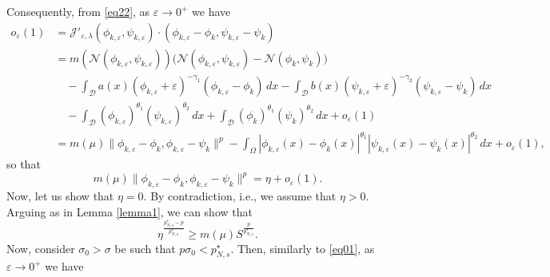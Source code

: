 \documentclass[10pt,a4paper]{amsart}
\numberwithin{equation}{section}
\begin{document}
Consequently, from \eqref{eq22}, as $\varepsilon\to 0^+$ we have
\begin{align*}
o_\varepsilon(1)
&=\mathcal{J}'_{\varepsilon,\lambda}(\phi_{k,\varepsilon},\psi_{k,\varepsilon})\cdot(\phi_{k,\varepsilon}-\phi_k,\psi_{k,\varepsilon}-\psi_k)\\
&=m(\mathcal{N}(\phi_{k,\varepsilon},\psi_{k,\varepsilon}))\Big(\mathcal{N}(\phi_{k,\varepsilon},\psi_{k,\varepsilon})-\mathcal{N}(\phi_k,\psi_k)\Big)\\
&\quad -\int_\mathcal{D}a(x) (\phi_{k,\varepsilon}+\varepsilon)^{-\gamma_1}(\phi_{k,\varepsilon}-\phi_k)\,dx-\int_\mathcal{D}b(x) (\psi_{k,\varepsilon}+\varepsilon)^{-\gamma_2}(\psi_{k,\varepsilon}-\psi_k)\,dx\\
&\quad -\int_\mathcal{D}(\phi_{k,\varepsilon})^{\theta_1}(\psi_{k,\varepsilon})^{\theta_2}\,dx+\int_\mathcal{D}(\phi_k)^{\theta_1}(\psi_k)^{\theta_2}\,dx+ o_\varepsilon(1)  \\
&=m(\mu)\| \phi_{k,\varepsilon}-\phi_k,\phi_{k,\varepsilon}-\psi_k\|^p-\int_\Omega |\phi_{k,\varepsilon}(x)-\phi_k(x)|^{\theta_1}|\psi_{k,\varepsilon}(x)-\psi_k(x)|^{\theta_2}\,dx+o_\varepsilon(1),
\end{align*}
so that 
$$
m(\mu)\| \phi_{k,\varepsilon}-\phi_k,\phi_{k,\varepsilon}-\psi_k\|^p
=\eta+o_\varepsilon(1).
$$
Now, let us show that $\eta=0$. By contradiction, i.e., we assume that $\eta>0$. 
Arguing as in Lemma \ref{lemma1}, we can show that
\begin{equation}
\eta^\frac{p^\star_{N,s}-p}{p^\star_{N,s}}\geq m(\mu)S^\frac{p}{p^\star_{N,s}}.
\end{equation}
Now, consider $\sigma_0>\sigma$ be such that $p\sigma_0<p_{N,s}^\star$. 
Then, similarly to \eqref{eq01}, as $\varepsilon\to 0^+$ we have
\end{document}
